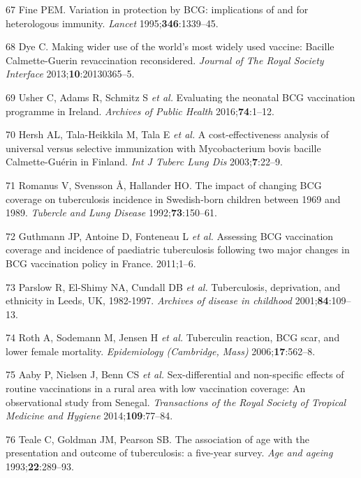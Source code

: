 \documentclass[11pt,twoside]{bristolthesis}
\begin{document}
  \leavevmode\hypertarget{ref-Fine1995}{}%
  67 Fine PEM. Variation in protection by BCG: implications of and for heterologous immunity. \emph{Lancet} 1995;\textbf{346}:1339--45.
  
  \leavevmode\hypertarget{ref-Dye2013a}{}%
  68 Dye C. Making wider use of the world's most widely used vaccine: Bacille Calmette-Guerin revaccination reconsidered. \emph{Journal of The Royal Society Interface} 2013;\textbf{10}:20130365--5.
  
  \leavevmode\hypertarget{ref-Usher2016}{}%
  69 Usher C, Adams R, Schmitz S \emph{et al.} Evaluating the neonatal BCG vaccination programme in Ireland. \emph{Archives of Public Health} 2016;\textbf{74}:1--12.
  
  \leavevmode\hypertarget{ref-Hersh2003}{}%
  70 Hersh AL, Tala-Heikkila M, Tala E \emph{et al.} A cost-effectiveness analysis of universal versus selective immunization with Mycobacterium bovis bacille Calmette-Guérin in Finland. \emph{Int J Tuberc Lung Dis} 2003;\textbf{7}:22--9.
  
  \leavevmode\hypertarget{ref-Romanus1992}{}%
  71 Romanus V, Svensson Å, Hallander HO. The impact of changing BCG coverage on tuberculosis incidence in Swedish-born children between 1969 and 1989. \emph{Tubercle and Lung Disease} 1992;\textbf{73}:150--61.
  
  \leavevmode\hypertarget{ref-Guthmann2011}{}%
  72 Guthmann JP, Antoine D, Fonteneau L \emph{et al.} Assessing BCG vaccination coverage and incidence of paediatric tuberculosis following two major changes in BCG vaccination policy in France. 2011;1--6.
  
  \leavevmode\hypertarget{ref-Parslow2001}{}%
  73 Parslow R, El-Shimy NA, Cundall DB \emph{et al.} Tuberculosis, deprivation, and ethnicity in Leeds, UK, 1982-1997. \emph{Archives of disease in childhood} 2001;\textbf{84}:109--13.
  
  \leavevmode\hypertarget{ref-Roth2006a}{}%
  74 Roth A, Sodemann M, Jensen H \emph{et al.} Tuberculin reaction, BCG scar, and lower female mortality. \emph{Epidemiology (Cambridge, Mass)} 2006;\textbf{17}:562--8.
  
  \leavevmode\hypertarget{ref-Aaby2014}{}%
  75 Aaby P, Nielsen J, Benn CS \emph{et al.} Sex-differential and non-specific effects of routine vaccinations in a rural area with low vaccination coverage: An observational study from Senegal. \emph{Transactions of the Royal Society of Tropical Medicine and Hygiene} 2014;\textbf{109}:77--84.
  
  \leavevmode\hypertarget{ref-Teale1993}{}%
  76 Teale C, Goldman JM, Pearson SB. The association of age with the presentation and outcome of tuberculosis: a five-year survey. \emph{Age and ageing} 1993;\textbf{22}:289--93.
  
\end{document}
